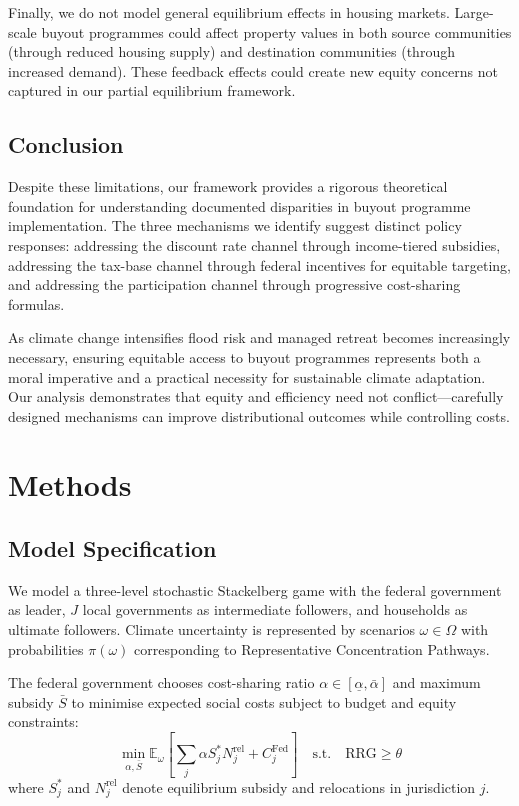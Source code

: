 \documentclass[11pt,letterpaper]{article}
\theoremstyle{definition}
\newcommand{\E}{\mathbb{E}}
\begin{document}
Finally, we do not model general equilibrium effects in housing markets. Large-scale buyout programmes could affect property values in both source communities (through reduced housing supply) and destination communities (through increased demand). These feedback effects could create new equity concerns not captured in our partial equilibrium framework.

\subsection{Conclusion}

Despite these limitations, our framework provides a rigorous theoretical foundation for understanding documented disparities in buyout programme implementation. The three mechanisms we identify suggest distinct policy responses: addressing the discount rate channel through income-tiered subsidies, addressing the tax-base channel through federal incentives for equitable targeting, and addressing the participation channel through progressive cost-sharing formulas.

As climate change intensifies flood risk and managed retreat becomes increasingly necessary, ensuring equitable access to buyout programmes represents both a moral imperative and a practical necessity for sustainable climate adaptation. Our analysis demonstrates that equity and efficiency need not conflict---carefully designed mechanisms can improve distributional outcomes while controlling costs.

\section{Methods}
\label{sec:methods}

\subsection{Model Specification}

We model a three-level stochastic Stackelberg game with the federal government as leader, $J$ local governments as intermediate followers, and households as ultimate followers. Climate uncertainty is represented by scenarios $\omega \in \Omega$ with probabilities $\pi(\omega)$ corresponding to Representative Concentration Pathways.

The federal government chooses cost-sharing ratio $\alpha \in [\underline{\alpha}, \bar{\alpha}]$ and maximum subsidy $\bar{S}$ to minimise expected social costs subject to budget and equity constraints:
\begin{equation}
\min_{\alpha, \bar{S}} \E_\omega\left[\sum_{j} \alpha S_j^* N_j^{\text{rel}} + C_j^{\text{Fed}}\right] \quad \text{s.t.} \quad \text{RRG} \geq \theta
\end{equation}
where $S_j^*$ and $N_j^{\text{rel}}$ denote equilibrium subsidy and relocations in jurisdiction $j$.
\end{document}
